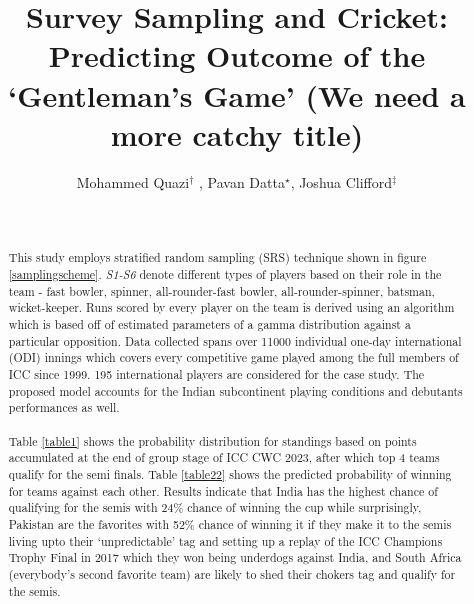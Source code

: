 \documentclass[12pt,A4]{article}
\begin{document}
 	\title{Survey Sampling and Cricket: Predicting Outcome of the `Gentleman's Game' (We need a more catchy title)}
\author{Mohammed Quazi$^{\dagger}$
, 
Pavan Datta$^{\star}$, Joshua Clifford$^{\ddagger}$
}

\date{}
\maketitle
\begin{abstract}\label{abstract}
		\\\\
		This study employs stratified random sampling  (SRS) technique shown in figure \ref{samplingscheme}. \textit{S1-S6} denote different types of players based on their role in the team - fast bowler, spinner, all-rounder-fast bowler, all-rounder-spinner, batsman, wicket-keeper. Runs scored by every player on the team is derived using an algorithm which is based off of estimated parameters of a gamma distribution against a particular opposition. Data collected spans over 11000 individual one-day international (ODI) innings which covers every competitive game played among the full members of ICC since 1999. 195 international players are considered for the case study. The proposed model accounts for the Indian subcontinent playing conditions and debutants performances as well. \\\\
		Table \ref{table1} shows the probability distribution for standings based on points accumulated at the end of group stage of ICC CWC 2023, after which top 4 teams qualify for the semi finals. Table \ref{table22} shows the predicted probability of winning for teams against each other. Results indicate that India has the highest chance of qualifying for the semis with 24\% chance of winning the cup while surprisingly, Pakistan are the favorites with 52\% chance of winning it if they make it to the semis living upto their `unpredictable' tag and setting up a replay of the ICC Champions Trophy Final in 2017 which they won being underdogs against India, and South Africa (everybody's second favorite team) are likely to shed their chokers tag and qualify for the semis.  \\\\

\end{abstract}
\end{document}
